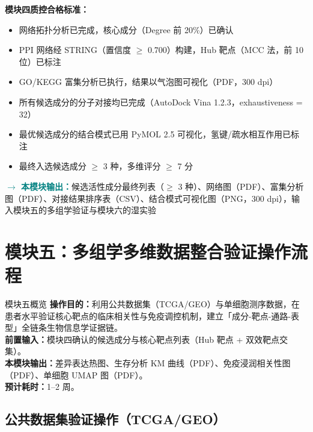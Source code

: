 \documentclass[12pt,a4paper,twoside]{article}
\newcommand{\moduleoutput}[1]{\par\vspace{6pt}\noindent\textcolor{teal}{\textbf{$\rightarrow$ 本模块输出：}}#1\vspace{6pt}}
\begin{document}
\begin{qcbox}
\textbf{模块四质控合格标准：}
\begin{itemize}
  \item 网络拓扑分析已完成，核心成分（Degree 前 20\%）已确认 
  \item PPI 网络经 STRING（置信度 $\geq$ 0.700）构建，Hub 靶点（MCC 法，前 10 位）已标注 
  \item GO/KEGG 富集分析已执行，结果以气泡图可视化（PDF，300 dpi）
  \item 所有候选成分的分子对接均已完成（AutoDock Vina 1.2.3，exhaustiveness = 32）
  \item 最优候选成分的结合模式已用 PyMOL 2.5 可视化，氢键/疏水相互作用已标注 
  \item 最终入选候选成分 $\geq$ 3 种，多维评分 $\geq$ 7 分 
\end{itemize}
\end{qcbox}

\moduleoutput{候选活性成分最终列表（$\geq$ 3 种）、网络图（PDF）、富集分析图（PDF）、对接结果排序表（CSV）、结合模式可视化图（PNG，300 dpi），输入模块五的多组学验证与模块六的湿实验}

\section{模块五：多组学多维数据整合验证操作流程}
\label{sec:module5}

\begin{infobox}{模块五概览}
\textbf{操作目的：}利用公共数据集（TCGA/GEO）与单细胞测序数据，在患者水平验证核心靶点的临床相关性与免疫调控机制，建立「成分-靶点-通路-表型」全链条生物信息学证据链。\\
\textbf{前置输入：}模块四确认的候选成分与核心靶点列表（Hub 靶点 + 双效靶点交集）。\\
\textbf{本模块输出：}差异表达热图、生存分析 KM 曲线（PDF）、免疫浸润相关性图（PDF）、单细胞 UMAP 图（PDF）。\\
\textbf{预计耗时：}1--2 周。
\end{infobox}

\subsection{公共数据集验证操作（TCGA/GEO）}
\label{sec:module5_public}
\end{document}
